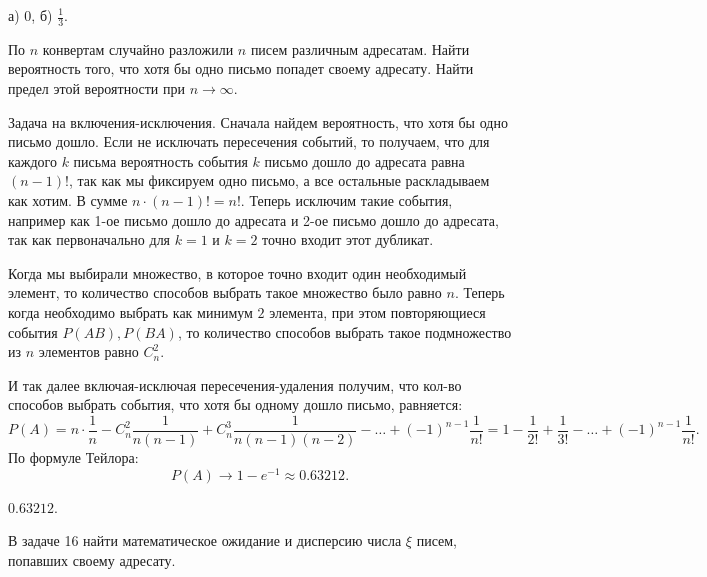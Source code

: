 \begin{result}
а) $0$, б) $\frac{1}{3}$.
\end{result}
\medskip
\begin{task}{16}
  По $n$ конвертам случайно разложили $n$ писем различным адресатам. Найти вероятность того, что
  хотя бы одно письмо попадет своему адресату. Найти предел этой вероятности при $n \to \infty$.
\end{task}

\begin{solution}
Задача на включения-исключения. Сначала найдем вероятность, что хотя бы одно письмо дошло. Если не
исключать пересечения событий, то получаем, что для каждого $k$ письма вероятность события $k$
письмо дошло до адресата равна $(n - 1)!$, так как мы фиксируем одно письмо, а все остальные
раскладываем как хотим. В сумме $n \cdot (n - 1)! = n!$. Теперь исключим такие события, например как
1-ое письмо дошло до адресата и 2-ое письмо дошло до адресата, так как первоначально для $k = 1$ и 
$k = 2$ точно входит этот дубликат.

Когда мы выбирали множество, в которое точно входит один необходимый элемент, то количество способов
выбрать такое множество было равно $n$. Теперь когда необходимо выбрать как минимум $2$ элемента,
при этом повторяющиеся события $P(AB), P(BA)$, то
количество способов выбрать такое подмножество из $n$ элементов равно $C_n^2$.

И так далее включая-исключая пересечения-удаления получим, что кол-во способов выбрать события, что
хотя бы одному дошло письмо, равняется: 
\[
P(A) = n \cdot \frac{1}{n} - C_n^2 \frac{1}{n(n-1)} + C_n^3 \frac{1}{n(n - 1)(n -2)} - \dots +
(-1)^{n - 1} \frac{1}{n!} = 1 - \frac{1}{2!} + \frac{1}{3!} - \dots + (-1)^{n - 1}\frac{1}{n!} 
.\] 
По формуле Тейлора:
\[
  P(A) \to  1 - e^{-1} \approx 0.63212
.\] 
\end{solution}

\begin{result}
$0.63212 $.
\end{result}


\medskip
\begin{task}{17}
В задаче 16 найти математическое ожидание и дисперсию числа $\xi$ писем, попавших своему адресату.
\end{task}

